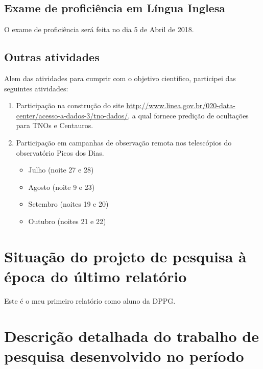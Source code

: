 \documentclass[a4paper, 11pt]{article}
\begin{document}
\subsection{Exame de profici\^encia em L\'ingua Inglesa}
O exame de proficiência será feita no dia 5 de Abril de 2018.

\newpage
\subsection{Outras atividades}

Alem das atividades para cumprir com o objetivo cientifico, participei das seguintes atividades:

\begin{enumerate}
  \item Participação na construção do site \url{http://www.linea.gov.br/020-data-center/acesso-a-dados-3/tno-dados/}, a qual fornece predição de ocultações para TNOs e Centauros. 
  \item Participação em campanhas de observação remota nos telescópios do observatório Picos dos Dias. 
% 
% 
  \begin{itemize}
    \item Julho (noite 27 e 28)
    \item Agosto (noite 9 e 23) %
    \item Setembro (noites 19 e 20)
    \item Outubro (noites 21 e 22)
  \end{itemize}
\end{enumerate}
\section{Situação do projeto de pesquisa à época do último relatório}
Este é o meu primeiro relatório como aluno da DPPG.
\section{Descrição detalhada do trabalho de pesquisa desenvolvido no período}

\end{document}
